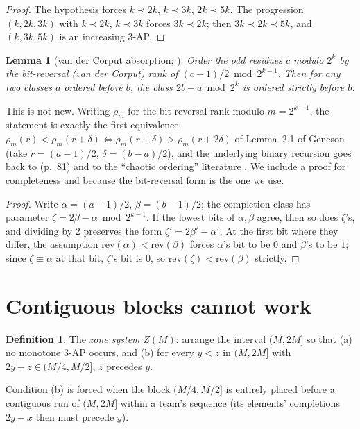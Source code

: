 \documentclass[11pt]{article}
\newtheorem{lemma}[theorem]{Lemma}
\theoremstyle{definition}
\newtheorem{definition}[theorem]{Definition}
\begin{document}
\begin{proof}
The hypothesis forces $k \prec 2k$, $k \prec 3k$, $2k \prec 5k$. The progression
$(k,2k,3k)$ with $k \prec 2k$, $k \prec 3k$ forces $3k \prec 2k$; then
$3k \prec 2k \prec 5k$, and $(k,3k,5k)$ is an increasing 3-AP.
\end{proof}

\begin{lemma}[van der Corput absorption; \cite{Gen26}]\label{thm:vdc}
Order the odd residues $c$ modulo $2^k$ by the bit-reversal (van der Corput) rank
of $(c-1)/2 \bmod 2^{k-1}$. Then for any two classes $a$ ordered before $b$, the
class $2b - a \bmod 2^k$ is ordered strictly before $b$.
\end{lemma}

\noindent This is not new. Writing $\rho_m$ for the bit-reversal rank modulo
$m = 2^{k-1}$, the statement is exactly the first equivalence
$\rho_m(r) < \rho_m(r+\delta) \iff \rho_m(r+\delta) > \rho_m(r+2\delta)$ of
Lemma~2.1 of Geneson \cite{Gen26} (take $r = (a-1)/2$,
$\delta = (b-a)/2$), and the underlying binary recursion goes back to
\cite{DEGS77} (p.~81) and to the ``chaotic ordering'' literature
\cite{ABJ11}. We include a proof for completeness and because the
bit-reversal form is the one we use.

\begin{proof}
Write $\alpha = (a-1)/2$, $\beta = (b-1)/2$; the completion class has parameter
$\zeta = 2\beta - \alpha \bmod 2^{k-1}$. If the lowest bits of $\alpha,\beta$
agree, then so does $\zeta$'s, and dividing by 2 preserves the form
$\zeta' = 2\beta' - \alpha'$. At the first bit where they differ, the assumption
$\mathrm{rev}(\alpha) < \mathrm{rev}(\beta)$ forces $\alpha$'s bit to be $0$ and
$\beta$'s to be $1$; since $\zeta \equiv \alpha$ at that bit, $\zeta$'s bit is
$0$, so $\mathrm{rev}(\zeta) < \mathrm{rev}(\beta)$ strictly.
\end{proof}

\section{Contiguous blocks cannot work}

\begin{definition}
The \emph{zone system} $Z(M)$: arrange the interval $(M, 2M]$ so that (a) no
monotone 3-AP occurs, and (b) for every $y < z$ in $(M,2M]$ with
$2y - z \in (M/4, M/2]$, $z$ precedes $y$.
\end{definition}

Condition (b) is forced when the block $(M/4, M/2]$ is entirely placed before a
contiguous run of $(M, 2M]$ within a team's sequence (its elements' completions
$2y - x$ then must precede $y$).
\end{document}
